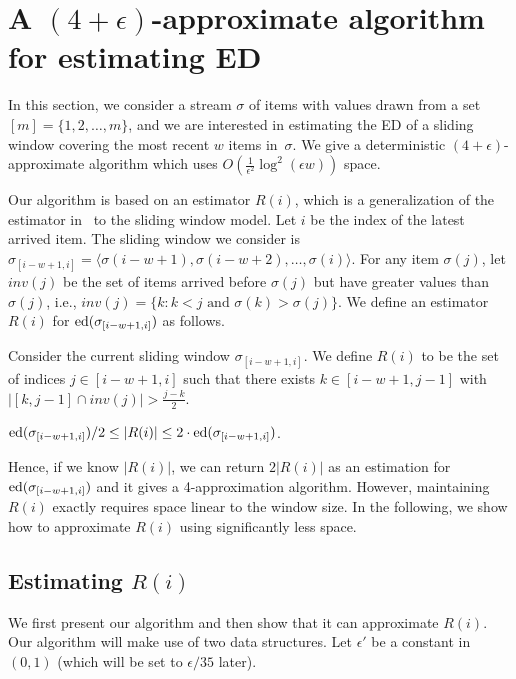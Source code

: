 \documentclass{llncs}
\newcommand{\ed}{{\rm ed}}
\newcommand{\swi}{\sigma_{[i-w+1,i]}}
\newcommand{\eps}{\epsilon}
\begin{document}
\section{A $(4+\epsilon)$-approximate algorithm for estimating ED}\label{sec:main}

In this section, we consider a stream $\sigma$ of items with values drawn
from a set $[m] = \{1, 2, \dots, m\}$,
and we are interested in estimating the ED of a sliding window covering
the most recent $w$ items in~$\sigma$.
We give a deterministic $(4+\epsilon)$-approximate algorithm
which uses $O( \frac{1}{\epsilon^2}\log^2(\epsilon w ))$ space.

Our algorithm is based on an estimator $R(i)$, which is a generalization of the estimator in~\cite{GJK+07}
to the sliding window model.
Let $i$ be the index of the latest arrived item.
The sliding window we consider is
$\swi = \langle \sigma(i-w+1), \sigma(i-w+2), \dots, \sigma(i) \rangle$.
For any item $\sigma(j)$, let $inv(j)$ be the set of items
arrived before $\sigma(j)$ but have greater values than
$\sigma(j)$, i.e., $inv(j) = \{ k : k < j \mbox{ and } \sigma(k) > \sigma(j)\}$.
We define an estimator $R(i)$ for $\ed(\swi)$ as follows.

\begin{definition}
Consider the current sliding window $\swi$.
We define $R(i)$ to be the set of indices $j \in [i-w+1, i]$ such that
there exists $k \in [i-w+1, j-1]$ with $|[k, j-1] \cap inv(j)|
> \frac{j-k}{2}$.
\end{definition}



\begin{lemma} \label{lem:estimator}
$\ed( \sigma_{[i-w+1,i]}) /2 \le |R(i)| \le 2 \cdot \ed( \sigma_{[i-w+1,i]})$.
\end{lemma}

Hence, if we know $|R(i)|$,
we can return $2 |R(i)|$ as an estimation for $\ed(\sigma_{[i-w+1,i]})$
and it gives a 4-approximation algorithm.
However, maintaining $R(i)$ exactly requires space linear
to the window size. In the following, we show how to approximate
$R(i)$ using significantly less space.

\subsection{Estimating $R(i)$}
We first present our algorithm and then show that it
can approximate $R(i)$. Our algorithm will
make use of two data structures.
Let $\eps'$ be a constant in $(0,1)$ (which will be
set to $\epsilon/35$ later).
\end{document}
